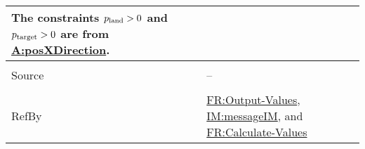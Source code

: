 \documentclass[12pt]{article}
\newcommand{\gt}{\ensuremath >}
\begin{document}
\begin{minipage}{\textwidth}
\begin{tabular}{>{\raggedright}p{}>{\raggedright\arraybackslash}p{}}
        The constraints ${p_{\text{land}}}\gt{}0$ and ${p_{\text{target}}}\gt{}0$ are from \hyperref[posXDirection]{A:posXDirection}.
        
\\ \midrule \\
Source & --
         
\\ \midrule \\
RefBy & \hyperref[outputValues]{FR:Output-Values}, \hyperref[IM:messageIM]{IM:messageIM}, and \hyperref[calcValues]{FR:Calculate-Values}
        
\\ \bottomrule
\end{tabular}
\end{minipage}

\vspace{\baselineskip}
\noindent
\end{document}
